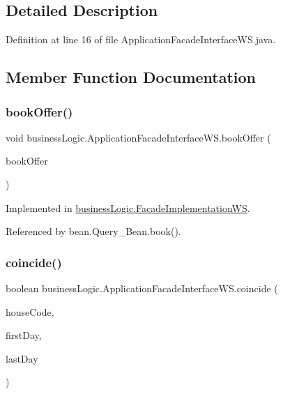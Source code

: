 \subsection{Detailed Description}


Definition at line 16 of file Application\+Facade\+Interface\+W\+S.\+java.



\subsection{Member Function Documentation}
\mbox{\label{interfacebusinessLogic_1_1ApplicationFacadeInterfaceWS_a9f2916ad64674d13dbfbe58252e28531}} 
\subsubsection{\texorpdfstring{bookOffer()}{bookOffer()}}
{\footnotesize\ttfamily void business\+Logic.\+Application\+Facade\+Interface\+W\+S.\+book\+Offer (\begin{DoxyParamCaption}\item[{\mbox{\hyperlink{classdomain_1_1Offer}{Offer}}}]{book\+Offer }\end{DoxyParamCaption})}



Implemented in \mbox{\hyperlink{classbusinessLogic_1_1FacadeImplementationWS_a0c3a269d277719643ca61e030580812a}{business\+Logic.\+Facade\+Implementation\+WS}}.



Referenced by bean.\+Query\+\_\+\+Bean.\+book().

\mbox{\label{interfacebusinessLogic_1_1ApplicationFacadeInterfaceWS_aa56165d498ff54ccd651fe5ce9a50902}} 
\subsubsection{\texorpdfstring{coincide()}{coincide()}}
{\footnotesize\ttfamily boolean business\+Logic.\+Application\+Facade\+Interface\+W\+S.\+coincide (\begin{DoxyParamCaption}\item[{\mbox{\hyperlink{classdomain_1_1RuralHouse}{Rural\+House}}}]{house\+Code,  }\item[{Date}]{first\+Day,  }\item[{Date}]{last\+Day }\end{DoxyParamCaption})}



